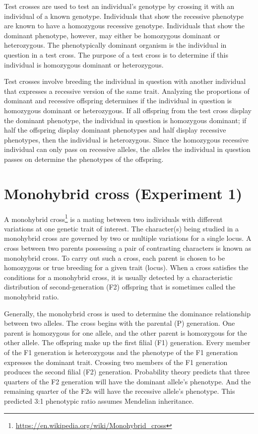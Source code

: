 \documentclass[]{book}
\let\rmarkdownfootnote\footnote%
\def\footnote{\protect\rmarkdownfootnote}
\renewcommand{\href}[2]{#2\footnote{\url{#1}}}
\theoremstyle{definition}
\theoremstyle{definition}
\theoremstyle{definition}
\theoremstyle{remark}
\begin{document}
Test crosses are used to test an individual's genotype by crossing it
with an individual of a known genotype. Individuals that show the
recessive phenotype are known to have a homozygous recessive genotype.
Individuals that show the dominant phenotype, however, may either be
homozygous dominant or heterozygous. The phenotypically dominant
organism is the individual in question in a test cross. The purpose of a
test cross is to determine if this individual is homozygous dominant or
heterozygous.

Test crosses involve breeding the individual in question with another
individual that expresses a recessive version of the same trait.
Analyzing the proportions of dominant and recessive offspring determines
if the individual in question is homozygous dominant or heterozygous. If
all offspring from the test cross display the dominant phenotype, the
individual in question is homozygous dominant; if half the offspring
display dominant phenotypes and half display recessive phenotypes, then
the individual is heterozygous. Since the homozygous recessive
individual can only pass on recessive alleles, the alleles the
individual in question passes on determine the phenotypes of the
offspring.

\section{Monohybrid cross (Experiment
1)}\label{monohybrid-cross-experiment-1}

A \href{https://en.wikipedia.org/wiki/Monohybrid_cross}{monohybrid
cross} is a mating between two individuals with different variations at
one genetic trait of interest. The character(s) being studied in a
monohybrid cross are governed by two or multiple variations for a single
locus. A cross between two parents possessing a pair of contrasting
characters is known as monohybrid cross. To carry out such a cross, each
parent is chosen to be homozygous or true breeding for a given trait
(locus). When a cross satisfies the conditions for a monohybrid cross,
it is usually detected by a characteristic distribution of
second-generation (F2) offspring that is sometimes called the monohybrid
ratio.

Generally, the monohybrid cross is used to determine the dominance
relationship between two alleles. The cross begins with the parental (P)
generation. One parent is homozygous for one allele, and the other
parent is homozygous for the other allele. The offspring make up the
first filial (F1) generation. Every member of the F1 generation is
heterozygous and the phenotype of the F1 generation expresses the
dominant trait. Crossing two members of the F1 generation produces the
second filial (F2) generation. Probability theory predicts that three
quarters of the F2 generation will have the dominant allele's phenotype.
And the remaining quarter of the F2s will have the recessive allele's
phenotype. This predicted 3:1 phenotypic ratio assumes Mendelian
inheritance.
\end{document}

